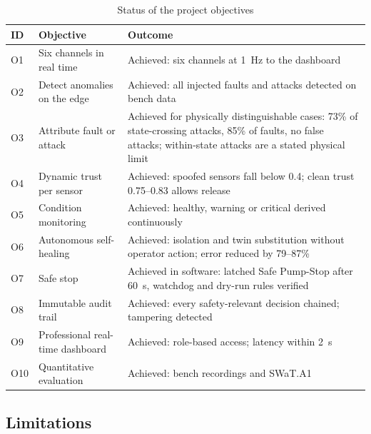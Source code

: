 \begin{table}[htbp]
\centering
\caption{Status of the project objectives}
\label{tab:objstatus}
\small
\begin{tabularx}{\textwidth}{@{}l X X@{}}
\toprule
\textbf{ID} & \textbf{Objective} & \textbf{Outcome} \\
\midrule
O1 & Six channels in real time & Achieved: six channels at 1~Hz to the dashboard \\
O2 & Detect anomalies on the edge & Achieved: all injected faults and attacks detected on bench data \\
O3 & Attribute fault or attack & Achieved for physically distinguishable cases: 73\% of state-crossing attacks, 85\% of faults, no false attacks; within-state attacks are a stated physical limit \\
O4 & Dynamic trust per sensor & Achieved: spoofed sensors fall below 0.4; clean trust 0.75--0.83 allows release \\
O5 & Condition monitoring & Achieved: healthy, warning or critical derived continuously \\
O6 & Autonomous self-healing & Achieved: isolation and twin substitution without operator action; error reduced by 79--87\% \\
O7 & Safe stop & Achieved in software: latched Safe Pump-Stop after 60~s, watchdog and dry-run rules verified \\
O8 & Immutable audit trail & Achieved: every safety-relevant decision chained; tampering detected \\
O9 & Professional real-time dashboard & Achieved: role-based access; latency within 2~s \\
O10 & Quantitative evaluation & Achieved: bench recordings and SWaT.A1 \\
\bottomrule
\end{tabularx}
\end{table}

\subsection{Limitations}
\label{sec:limits}

